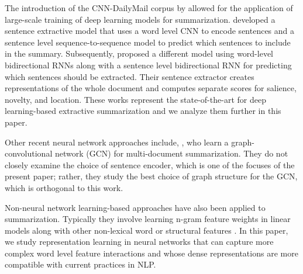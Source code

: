 
The introduction of the CNN-DailyMail corpus by \citet{nips15_hermann} 
allowed for the application of large-scale training of deep learning models 
for summarization.
\citet{cheng2016neural} developed a sentence extractive model that uses a 
word level CNN to encode sentences and a sentence level sequence-to-sequence 
model to predict which sentences to include in the summary. Subsequently, 
\citet{nallapati2017summarunner} proposed a different model using word-level 
bidirectional RNNs along with a sentence level 
bidirectional RNN for predicting which sentences should be extracted. 
Their sentence extractor creates representations of the whole document and 
computes separate scores for salience, novelty, and location.
These works represent the state-of-the-art for deep learning-based extractive
summarization and we analyze them further in this paper.

Other recent neural network approaches include, \citet{yasunaga2017graph},
who learn a graph-convolutional network (GCN) for multi-document summarization.
They do not 
closely examine the choice of sentence encoder, which is one of the focuses
of the present paper; rather, they study the best choice of graph 
structure for the GCN, which is orthogonal to this work. 

Non-neural network learning-based approaches have also been applied
to summarization. Typically they involve learning n-gram feature weights 
in linear models along with other non-lexical word or 
structural features 
\cite{berg2011jointly,sipos2012large,durrett2016learning}.
In this paper, we study representation learning in
neural networks that can capture more complex word level feature interactions
and whose dense representations are more compatible with current practices
in NLP.








